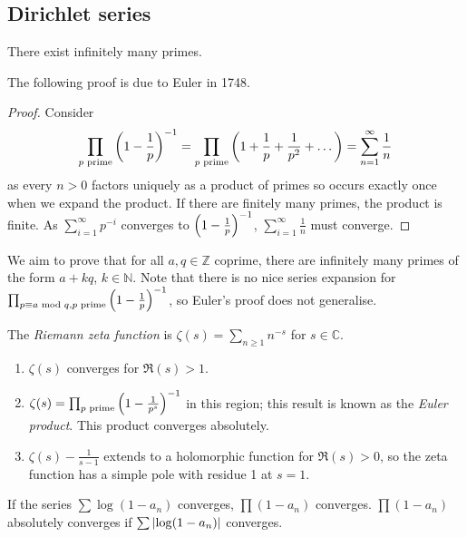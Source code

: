 \subsection{Dirichlet series}
\begin{theorem}[Euclid]
    There exist infinitely many primes.
\end{theorem}
The following proof is due to Euler in 1748.
\begin{proof}
    Consider
    \[ \prod_{p \text{ prime}} \qty(1 - \frac{1}{p})^{-1} = \prod_{p \text{ prime}} \qty(1 + \frac{1}{p} + \frac{1}{p^2} + \dots) = \sum_{n=1}^\infty \frac{1}{n} \]
    as every \( n > 0 \) factors uniquely as a product of primes so occurs exactly once when we expand the product.
    If there are finitely many primes, the product is finite.
    As \( \sum_{i=1}^\infty p^{-i} \) converges to \( \qty(1 - \frac{1}{p})^{-1} \), \( \sum_{i=1}^\infty \frac{1}{n} \) must converge.
\end{proof}
We aim to prove that for all \( a, q \in \mathbb Z \) coprime, there are infinitely many primes of the form \( a + kq \), \( k \in \mathbb N \).
Note that there is no nice series expansion for \( \prod_{p \equiv a \text{ mod } q, p \text{ prime}} \qty(1 - \frac{1}{p})^{-1} \), so Euler's proof does not generalise.
\begin{definition}
    The \emph{Riemann zeta function} is \( \zeta(s) = \sum_{n \geq 1} n^{-s} \) for \( s \in \mathbb C \).
\end{definition}
\begin{proposition}
    \begin{enumerate}
        \item \( \zeta(s) \) converges for \( \Re(s) > 1 \).
        \item \( \zeta(s) = \prod_{p \text{ prime}} \qty(1 - \frac{1}{p^s})^{-1} \) in this region; this result is known as the \emph{Euler product}.
        This product converges absolutely.
        \item \( \zeta(s) - \frac{1}{s - 1} \) extends to a holomorphic function for \( \Re(s) > 0 \), so the zeta function has a simple pole with residue 1 at \( s = 1 \).
    \end{enumerate}
\end{proposition}
If the series \( \sum \log(1 - a_n) \) converges, \( \prod (1 - a_n) \) converges.
\( \prod (1 - a_n) \) absolutely converges if \( \sum \abs{\log(1-a_n)} \) converges.

